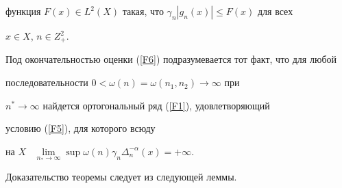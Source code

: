 функция $F(x)\in L^2(X)$ такая, что $ \gamma_n|g_n(x)|\le F(x)$ для всех


$x\in X$, $n\in Z^2_+$.





Под окончательностью оценки (\ref{F6}) подразумевается тот факт, что для любой


последовательности $ 0< \omega (n)=\omega (n_1,n_2 ) \to \infty $ при


$n^*\to \infty $ найдется ортогональный ряд (\ref{F1}), удовлетворяющий 


условию (\ref{F5}), для которого всюду


на $X$ \ $\lim \limits_{n_* \to \infty } \sup \omega (n)


\gamma_n \Delta_n^{-\alpha }(x)=+\infty$.





Доказательство теоремы следует из следующей леммы.





